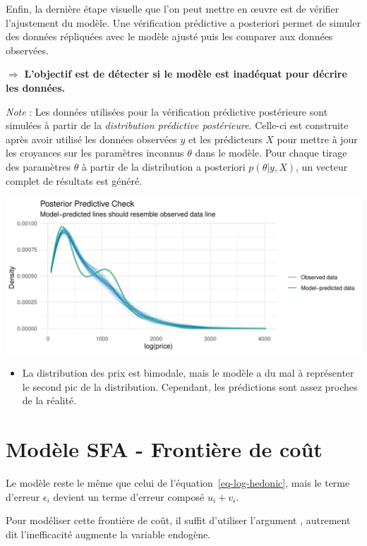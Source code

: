 \documentclass[
  12pt,
]{report}
\providecommand{\tightlist}{%
  \setlength{\itemsep}{0pt}\setlength{\parskip}{0pt}}\usepackage{longtable,booktabs,array}
\renewcommand{\texttt}[1]{\colorbox{light}{\color{highlight}{\ttfamily{#1}}}}
\begin{document}
\newpage

Enfin, la dernière étape visuelle que l'on peut mettre en œuvre est de
vérifier l'ajustement du modèle. Une vérification prédictive a
posteriori permet de simuler des données répliquées avec le modèle
ajusté puis les comparer aux données observées.

\(\Rightarrow\) \textbf{L'objectif est de détecter si le modèle est
inadéquat pour décrire les données.}

\emph{Note} : Les données utilisées pour la vérification prédictive
postérieure sont simulées à partir de la \emph{distribution prédictive
postérieure}. Celle-ci est construite après avoir utilisé les données
observées \(y\) et les prédicteurs \(X\) pour mettre à jour les
croyances sur les paramètres inconnus \(\theta\) dans le modèle. Pour
chaque tirage des paramètres \(\theta\) à partir de la distribution a
posteriori \(p(\theta|y,X)\), un vecteur complet de résultats est
généré.

\includegraphics{report_files/figure-pdf/posterior-1.pdf}

\begin{itemize}
\tightlist
\item
  La distribution des prix est bimodale, mais le modèle a du mal à
  représenter le second pic de la distribution. Cependant, les
  prédictions sont assez proches de la réalité.
\end{itemize}

\section{Modèle SFA - Frontière de
coût}\label{moduxe8le-sfa---frontiuxe8re-de-couxfbt}

Le modèle reste le même que celui de l'équation~\ref{eq-log-hedonic},
mais le terme d'erreur \(\epsilon_i\) devient un terme d'erreur composé
\(u_i + v_i\).

Pour modéliser cette frontière de coût, il suffit d'utiliser l'argument
\texttt{ineffDecrease\ =\ FALSE}, autrement dit l'inefficacité augmente
la variable endogène.
\end{document}
